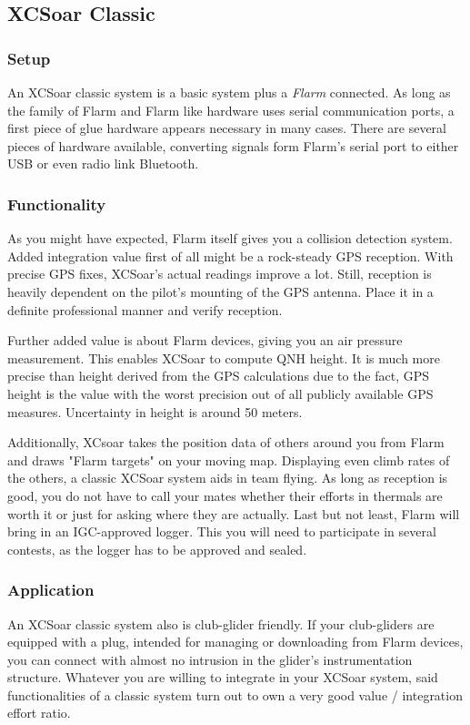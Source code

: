 \subsection*{XCSoar Classic}
\subsubsection*{Setup} An XCSoar classic system is a basic system plus a 
\emph{Flarm} connected. As long as the family of Flarm and Flarm like hardware 
uses serial communication ports, a first piece of glue hardware appears necessary 
in many cases. There are several pieces of hardware available, converting signals 
form Flarm's serial port to either USB or even radio link Bluetooth.

\subsubsection*{Functionality} As you might have expected, Flarm itself gives you 
a collision detection system. Added integration value first of all might be a 
rock-steady GPS reception. With precise GPS fixes, XCSoar's actual readings 
improve a lot. Still, reception is heavily dependent on the pilot's mounting of 
the GPS antenna. Place it in a definite professional manner and verify reception.

Further added value is about Flarm devices, giving you an air pressure 
measurement. This enables XCSoar to compute QNH height. It is much more precise 
than height derived from the GPS calculations due to the fact, GPS height is the 
value with the worst precision out of all publicly available GPS measures. 
Uncertainty in height is around 50 meters.

Additionally, XCsoar takes the position data of others around you from Flarm and 
draws "Flarm targets" on your moving map. Displaying even climb rates of the 
others, a classic XCSoar system aids in team flying. As long as reception is 
good, you do not have to call your mates whether their efforts in thermals are 
worth it or just for asking where they are actually. Last but not least, Flarm 
will bring in an IGC-approved logger. This you will need to participate in 
several contests, as the logger has to be approved and sealed.

\subsubsection*{Application} An XCSoar classic system also is club-glider 
friendly. If your club-gliders are equipped with a plug, intended for managing or 
downloading from Flarm devices, you can connect with almost no intrusion in the 
glider's instrumentation structure. Whatever you are willing to integrate in your 
XCSoar system, said functionalities of a classic system turn out to own a very 
good value / integration effort ratio.

